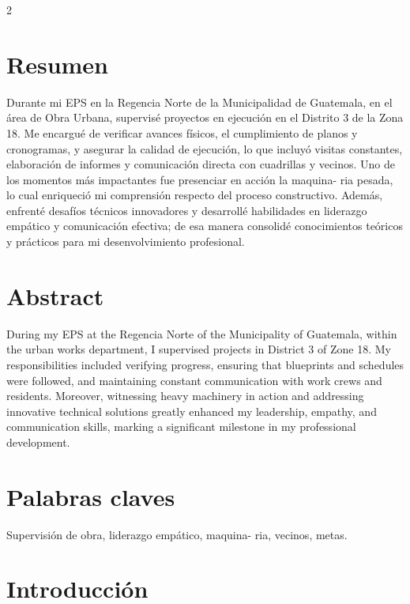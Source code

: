 \documentclass[12pt,spanish,Letterpaper,openany]{book}
\begin{document}
\begin {multicols}{2}

\hypertarget{resumen-3}{%
\section{Resumen}\label{resumen-3}}

Durante mi EPS en la Regencia Norte de la Municipalidad de Guatemala, en el área de Obra Urbana, supervisé proyectos en ejecución en el Distrito 3 de la Zona 18. Me encargué de verificar avances físicos, el cumplimiento de planos y cronogramas, y asegurar la calidad de ejecución, lo que incluyó visitas constantes, elaboración de informes y comunicación directa con cuadrillas y vecinos. Uno de los momentos más impactantes fue presenciar en acción la maquina-
ria pesada, lo cual enriqueció mi comprensión respecto del proceso constructivo. Además, enfrenté desafíos técnicos innovadores y desarrollé habilidades en liderazgo empático y comunicación efectiva; de esa manera consolidé conocimientos teóricos y prácticos para mi desenvolvimiento profesional.

\hypertarget{abstract-3}{%
\section{Abstract}\label{abstract-3}}

During my EPS at the Regencia Norte of the Municipality of Guatemala, within the urban works department, I supervised projects in District 3 of Zone 18. My responsibilities included verifying progress, ensuring that blueprints and schedules were followed, and maintaining constant communication with work crews and residents. Moreover, witnessing heavy machinery in action and addressing innovative technical solutions greatly enhanced my leadership, empathy, and communication skills, marking a significant milestone in my professional development.

\hypertarget{palabras-claves-3}{%
\section{Palabras claves}\label{palabras-claves-3}}

Supervisión de obra, liderazgo empático, maquina-
ria, vecinos, metas.

\hypertarget{introducciuxf3n-3}{%
\section{Introducción}\label{introducciuxf3n-3}}


\end{multicols}
\end{document}
